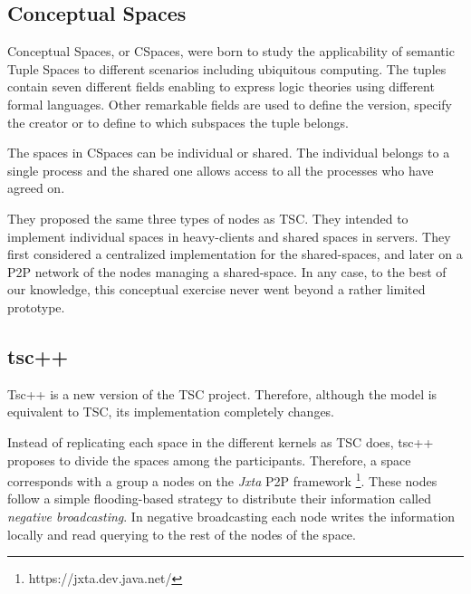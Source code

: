 \subsection{Conceptual Spaces}

Conceptual Spaces, or CSpaces, were born to study the applicability of semantic Tuple Spaces to different scenarios including ubiquitous computing.
The tuples contain seven different fields enabling to express logic theories using different formal languages.
Other remarkable fields are used to define the version, specify the creator or to define to which subspaces the tuple belongs. %

The spaces in CSpaces can be individual or shared.
The individual belongs to a single process and the shared one allows access to all the processes who have agreed on.

They proposed the same three types of nodes as TSC.
They intended to implement individual spaces in heavy-clients and shared spaces in servers.
They first considered a centralized implementation for the shared-spaces, %
and later on a P2P network of the nodes managing a shared-space. %
In any case, to the best of our knowledge, this conceptual exercise never went beyond a rather limited prototype.



\subsection{tsc++}

Tsc++ \cite{krummenacher_open_2009} is a new version of the TSC project.
Therefore, although the model is equivalent to TSC, its implementation completely changes.


Instead of replicating each space in the different kernels as TSC does, tsc++ proposes to divide the spaces among the participants.
Therefore, a space corresponds with a group a nodes on the \emph{Jxta} P2P framework \footnote{https://jxta.dev.java.net/}. %
These nodes follow a simple flooding-based strategy to distribute their information called \emph{negative broadcasting}.
In negative broadcasting each node writes the information locally and read querying to the rest of the nodes of the space.


